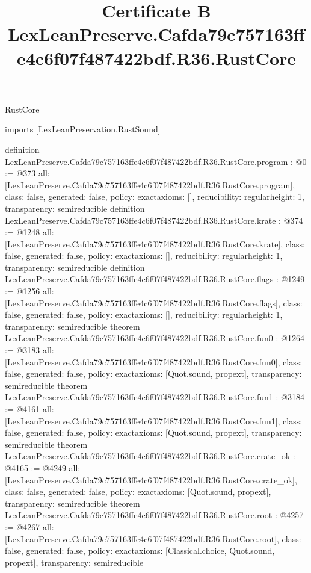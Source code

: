 \begin{lexlean}{RustCore}
\title{Certificate B LexLeanPreserve.Cafda79c757163ffe4c6f07f487422bdf.R36.RustCore}
\begin{coremodule}
imports [LexLeanPreservation.RustSound]

definition LexLeanPreserve.Cafda79c757163ffe4c6f07f487422bdf.R36.RustCore.program : @0 := @373 {
  all: [LexLeanPreserve.Cafda79c757163ffe4c6f07f487422bdf.R36.RustCore.program],
  class: false,
  generated: false,
  policy: exact{axioms: []},
  reducibility: regular{height: 1},
  transparency: semireducible
}
definition LexLeanPreserve.Cafda79c757163ffe4c6f07f487422bdf.R36.RustCore.krate : @374 := @1248 {
  all: [LexLeanPreserve.Cafda79c757163ffe4c6f07f487422bdf.R36.RustCore.krate],
  class: false,
  generated: false,
  policy: exact{axioms: []},
  reducibility: regular{height: 1},
  transparency: semireducible
}
definition LexLeanPreserve.Cafda79c757163ffe4c6f07f487422bdf.R36.RustCore.flags : @1249 := @1256 {
  all: [LexLeanPreserve.Cafda79c757163ffe4c6f07f487422bdf.R36.RustCore.flags],
  class: false,
  generated: false,
  policy: exact{axioms: []},
  reducibility: regular{height: 1},
  transparency: semireducible
}
theorem LexLeanPreserve.Cafda79c757163ffe4c6f07f487422bdf.R36.RustCore.fun0 : @1264 := @3183 {
  all: [LexLeanPreserve.Cafda79c757163ffe4c6f07f487422bdf.R36.RustCore.fun0],
  class: false,
  generated: false,
  policy: exact{axioms: [Quot.sound, propext]},
  transparency: semireducible
}
theorem LexLeanPreserve.Cafda79c757163ffe4c6f07f487422bdf.R36.RustCore.fun1 : @3184 := @4161 {
  all: [LexLeanPreserve.Cafda79c757163ffe4c6f07f487422bdf.R36.RustCore.fun1],
  class: false,
  generated: false,
  policy: exact{axioms: [Quot.sound, propext]},
  transparency: semireducible
}
theorem LexLeanPreserve.Cafda79c757163ffe4c6f07f487422bdf.R36.RustCore.crate_ok : @4165 := @4249 {
  all: [LexLeanPreserve.Cafda79c757163ffe4c6f07f487422bdf.R36.RustCore.crate_ok],
  class: false,
  generated: false,
  policy: exact{axioms: [Quot.sound, propext]},
  transparency: semireducible
}
theorem LexLeanPreserve.Cafda79c757163ffe4c6f07f487422bdf.R36.RustCore.root : @4257 := @4267 {
  all: [LexLeanPreserve.Cafda79c757163ffe4c6f07f487422bdf.R36.RustCore.root],
  class: false,
  generated: false,
  policy: exact{axioms: [Classical.choice, Quot.sound, propext]},
  transparency: semireducible
}


\end{coremodule}
\end{lexlean}

